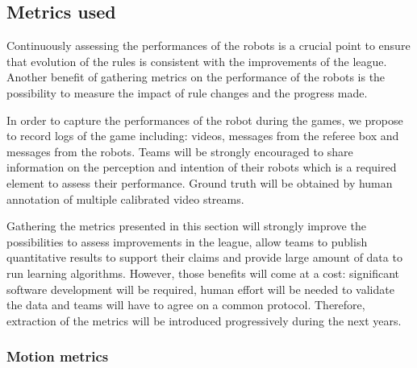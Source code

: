 \documentclass{article}
\begin{document}
\subsection{\label{sec:metrics}Metrics used}
Continuously assessing the performances of the robots is a crucial point to
ensure that evolution of the rules is consistent with the improvements of the league.
Another benefit of gathering metrics on the performance of the robots is the possibility to
measure the impact of rule changes and the progress made.

In order to capture the performances of the robot during the games, we propose
to record logs of the game including: videos, messages from the referee box and
messages from the robots.
Teams will be strongly encouraged to share information on the perception and
intention of their robots which is a required element to assess their performance.
Ground truth will be obtained by human annotation of multiple calibrated video streams.

Gathering the metrics presented in this section will strongly improve the
possibilities to assess improvements in the league, allow teams to publish
quantitative results to support their claims and provide large amount of data
to run learning algorithms.
However, those benefits will come at a cost:
significant software development will be required,
human effort will be needed to validate the data and teams will have to agree on
a common protocol.
Therefore, extraction of the metrics will be introduced progressively during the
next years.


\subsubsection{Motion metrics}
\end{document}
